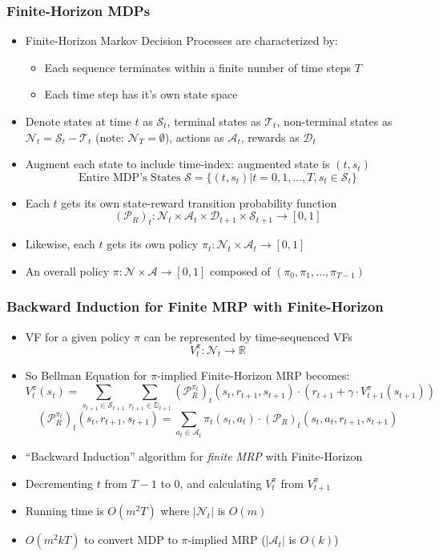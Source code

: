 \documentclass[handout]{beamer}
\begin{document}
\begin{frame}
\frametitle{Finite-Horizon MDPs}
\pause
\begin{itemize}[<+->]
\item Finite-Horizon Markov Decision Processes are characterized by:
\begin{itemize}
\item Each sequence terminates within a finite number of time steps $T$
\item Each time step has it's own state space
\end{itemize} 
\item Denote states at time $t$ as $\mathcal{S}_t$, terminal states as $\mathcal{T}_t$,  non-terminal states as $\mathcal{N}_t = \mathcal{S}_t - \mathcal{T}_t$ (note: $\mathcal{N}_T = \emptyset$), actions as $\mathcal{A}_t$, rewards as $\mathcal{D}_t$
\item Augment each state to include time-index: augmented state is $(t, s_t)$
$$\text{Entire MDP's States } \mathcal{S} = \{(t, s_t) | t = 0, 1, \ldots, T, s_t \in \mathcal{S}_t\}$$
\item Each $t$ gets its own state-reward transition probability function
$$(\mathcal{P}_R)_t: \mathcal{N}_t \times \mathcal{A}_t \times \mathcal{D}_{t+1} \times \mathcal{S}_{t+1} \rightarrow [0, 1]$$
\item Likewise, each $t$ gets its own policy $\pi_t: \mathcal{N}_t \times \mathcal{A}_t \rightarrow [0, 1]$
\item An overall policy $\pi: \mathcal{N} \times \mathcal{A} \rightarrow [0,1]$ composed of $(\pi_0, \pi_1, \ldots, \pi_{T-1})$
\end{itemize}
\end{frame}

\begin{frame}
\frametitle{Backward Induction for Finite MRP with Finite-Horizon}
\pause
\begin{itemize}[<+->]
\item VF for a given policy $\pi$ can be represented by time-sequenced VFs
$$V^{\pi}_t: \mathcal{N}_t \rightarrow \mathbb{R}$$
\item So Bellman Equation for $\pi$-implied Finite-Horizon MRP becomes:
$$V^{\pi}_t(s_t) = \sum_{s_{t+1} \in \mathcal{S}_{t+1}} \sum_{r_{t+1} \in \mathbb{D}_{t+1}} (\mathcal{P}_R^{\pi_t})_t(s_t, r_{t+1}, s_{t+1}) \cdot (r_{t+1} + \gamma \cdot V^{\pi}_{t+1}(s_{t+1}))$$
$$(\mathcal{P}_R^{\pi_t})_t(s_t, r_{t+1}, s_{t+1}) = \sum_{a_t \in \mathcal{A}_t} \pi_t(s_t, a_t) \cdot (\mathcal{P}_R)_t(s_t, a_t, r_{t+1}, s_{t+1})$$
\item ``Backward Induction'' algorithm for {\em finite MRP} with Finite-Horizon
\item Decrementing $t$ from $T-1$ to 0, and calculating $V_t^{\pi}$ from $V_{t+1}^{\pi}$
\item Running time is $O(m^2 T)$ where $|\mathcal{N}_t|$ is $O(m)$
\item $O(m^2 k T)$ to convert MDP to $\pi$-implied MRP ($|\mathcal{A}_t|$ is $O(k)$)
\end{itemize}
\end{frame}
\end{document}
